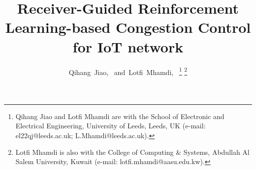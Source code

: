 \documentclass[journal]{IEEEtran}
\begin{document}
%
\title{Receiver-Guided Reinforcement Learning-based Congestion Control for IoT network}
%
%
%

\author{
Qihang~Jiao,~
and~Lotfi~Mhamdi,~%
\thanks{Qihang Jiao and Lotfi Mhamdi are with the School of Electronic and Electrical Engineering, University of Leeds, Leeds, UK (e-mail: el22qj@leeds.ac.uk; L.Mhamdi@leeds.ac.uk).}%
\thanks{Lotfi Mhamdi is also with the College of Computing \& Systems, Abdullah Al Salem University, Kuwait (e-mail: lotfi.mhamdi@aasu.edu.kw).}
}

% 











\maketitle
\end{document}
